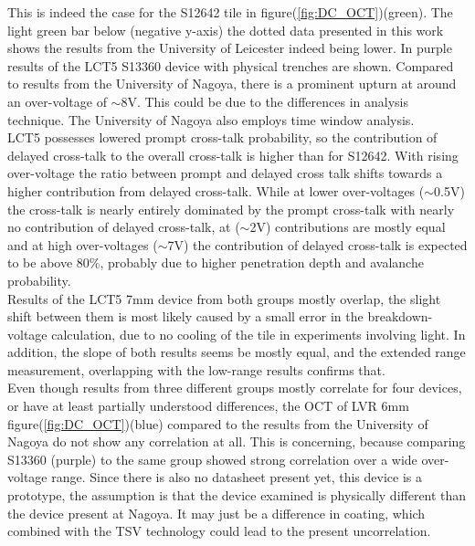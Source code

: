 \documentclass[12pt,article,type=msc,colorback,accentcolor=tud9c]{tudthesis}
\begin{document}
This is indeed the case for the S12642 tile in figure(\ref{fig:DC_OCT})(green). The light green bar below (negative y-axis) the dotted data presented in this work shows the results from the University of Leicester indeed being lower. In purple results of the LCT5 S13360 device with physical trenches are shown. Compared to results from the University of Nagoya, there is a prominent upturn at around an over-voltage of $\sim$8V. This could be due to the differences in analysis technique. The University of Nagoya also employs time window analysis.\\ LCT5 possesses lowered prompt cross-talk probability, so the contribution of delayed cross-talk to the overall cross-talk is higher than for S12642. With rising over-voltage the ratio between prompt and delayed cross talk shifts towards a higher contribution from delayed cross-talk\cite{DelayedOCT}\cite{Yamamoto}. While at lower over-voltages ($\sim$0.5V) the cross-talk is nearly entirely dominated by the prompt cross-talk with nearly no contribution of delayed cross-talk, at ($\sim$2V) contributions are mostly equal and at high over-voltages ($\sim$7V) the contribution of delayed cross-talk is expected to be above 80\%, probably due to higher penetration depth and avalanche probability.\\
Results of the LCT5 7mm device from both groups mostly overlap, the slight shift between them is most likely caused by a small error in the breakdown-voltage calculation, due to no cooling of the tile in experiments involving light. In addition, the slope of both results seems be mostly equal, and the extended range measurement, overlapping with the low-range results confirms that.\\
Even though results from three different groups mostly correlate for four devices, or have at least partially understood differences, the OCT of LVR 6mm figure(\ref{fig:DC_OCT})(blue) compared to the results from the University of Nagoya do not show any correlation at all. This is concerning, because comparing S13360 (purple) to the same group showed strong correlation over a wide over-voltage range. Since there is also no datasheet present yet, this device is a prototype, the assumption is that the device examined is physically different than the device present at Nagoya. It may just be a difference in coating, which combined with the TSV technology could lead to the present uncorrelation\cite{Yamamoto}.






\end{document}
